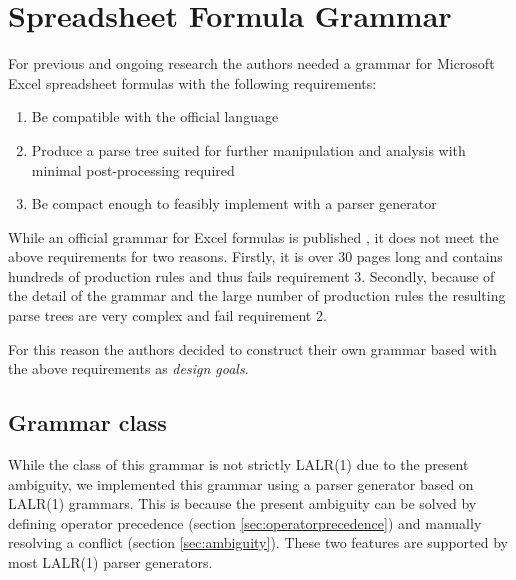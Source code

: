 \documentclass[conference]{IEEEtran}
\begin{document}
\section{Spreadsheet Formula Grammar}
\label{section:grammar}

For previous and ongoing research the authors needed a grammar for Microsoft Excel spreadsheet formulas with the following requirements:

\label{sec:designgoals}
\begin{enumerate}
\item Be compatible with the official language
\item Produce a parse tree suited for further manipulation and analysis with minimal post-processing required
\item Be compact enough to feasibly implement with a parser generator
\end{enumerate}

While an official grammar for Excel formulas is published \cite{ExcelOfficialGrammar}, it does not meet the above requirements for two reasons.
Firstly, it is over 30 pages long and contains hundreds of production rules and thus fails requirement 3.
Secondly, because of the detail of the grammar and the large number of production rules the resulting parse trees are very complex and fail requirement 2.

For this reason the authors decided to construct their own grammar based with the above requirements as \emph{design goals}.

\subsection{Grammar class}

While the class of this grammar is not strictly LALR(1) due to the present ambiguity, we implemented this grammar using a parser generator based on LALR(1) grammars.
This is because the present ambiguity can be solved by defining operator precedence (section \ref{sec:operatorprecedence}) and manually resolving a conflict (section \ref{sec:ambiguity}).
These two features are supported by most LALR(1) parser generators.
\end{document}
